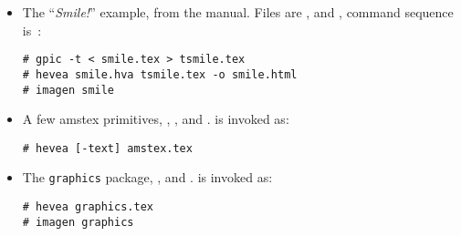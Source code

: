 \documentclass{article}
\begin{document}
\begin{itemize}
\item The ``\emph{Smile!}'' example, from the manual.
Files are ,  and
, command sequence is~:
\begin{verbatim}
# gpic -t < smile.tex > tsmile.tex
# hevea smile.hva tsmile.tex -o smile.html
# imagen smile
\end{verbatim}

\item A few amstex primitives, ,
,  and .
\hevea{} is invoked as:
\begin{verbatim}
# hevea [-text] amstex.tex
\end{verbatim}

\item The \texttt{graphics} package, ,
 and .
\hevea{} is invoked as:
\begin{verbatim}
# hevea graphics.tex
# imagen graphics
\end{verbatim} 
\end{itemize}
\end{document}
